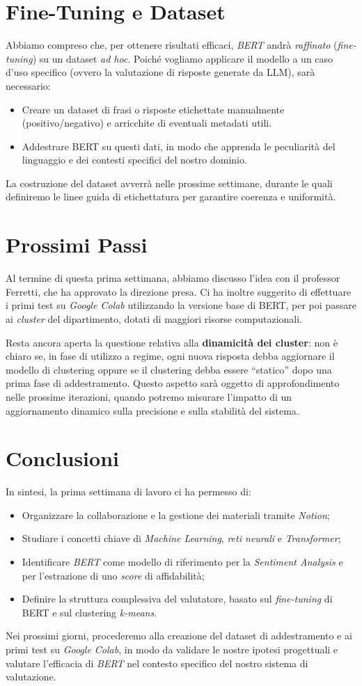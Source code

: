 \documentclass[a4paper,12pt]{article}
\begin{document}
\section*{Fine-Tuning e Dataset}
Abbiamo compreso che, per ottenere risultati efficaci, \emph{BERT} andrà \emph{raffinato} (\emph{fine-tuning}) su un dataset \emph{ad hoc}. Poiché vogliamo applicare il modello a un caso d'uso specifico (ovvero la valutazione di risposte generate da LLM), sarà necessario:
\begin{itemize}
    \item Creare un dataset di frasi o risposte etichettate manualmente (positivo/negativo) e arricchite di eventuali metadati utili.
    \item Addestrare BERT su questi dati, in modo che apprenda le peculiarità del linguaggio e dei contesti specifici del nostro dominio.
\end{itemize}
La costruzione del dataset avverrà nelle prossime settimane, durante le quali definiremo le linee guida di etichettatura per garantire coerenza e uniformità.

\section*{Prossimi Passi}
Al termine di questa prima settimana, abbiamo discusso l’idea con il professor Ferretti, che ha approvato la direzione presa. Ci ha inoltre suggerito di effettuare i primi test su \emph{Google Colab} utilizzando la versione base di BERT, per poi passare ai \emph{cluster} del dipartimento, dotati di maggiori risorse computazionali. 

Resta ancora aperta la questione relativa alla \textbf{dinamicità dei cluster}: non è chiaro se, in fase di utilizzo a regime, ogni nuova risposta debba aggiornare il modello di clustering oppure se il clustering debba essere “statico” dopo una prima fase di addestramento. Questo aspetto sarà oggetto di approfondimento nelle prossime iterazioni, quando potremo misurare l’impatto di un aggiornamento dinamico sulla precisione e sulla stabilità del sistema.

\section*{Conclusioni}
In sintesi, la prima settimana di lavoro ci ha permesso di:
\begin{itemize}
    \item Organizzare la collaborazione e la gestione dei materiali tramite \emph{Notion};
    \item Studiare i concetti chiave di \emph{Machine Learning}, \emph{reti neurali} e \emph{Transformer};
    \item Identificare \emph{BERT} come modello di riferimento per la \emph{Sentiment Analysis} e per l’estrazione di uno \emph{score} di affidabilità;
    \item Definire la struttura complessiva del valutatore, basato sul \emph{fine-tuning} di BERT e sul clustering \emph{k-means}.
\end{itemize}

Nei prossimi giorni, procederemo alla creazione del dataset di addestramento e ai primi test su \emph{Google Colab}, in modo da validare le nostre ipotesi progettuali e valutare l’efficacia di \emph{BERT} nel contesto specifico del nostro sistema di valutazione.
\end{document}

